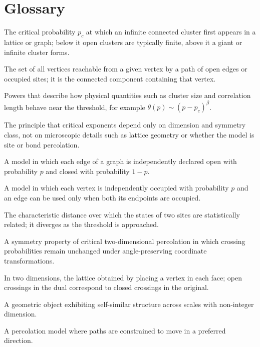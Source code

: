\section*{Glossary}
\begin{description}[leftmargin=*,style=nextline,itemsep=0.3em]
\item[\textbf{Percolation threshold.}] The critical probability $p_c$ at which an infinite connected cluster first appears in a lattice or graph; below it open clusters are typically finite, above it a giant or infinite cluster forms.
\item[\textbf{Open cluster.}] The set of all vertices reachable from a given vertex by a path of open edges or occupied sites; it is the connected component containing that vertex.
\item[\textbf{Critical exponents.}] Powers that describe how physical quantities such as cluster size and correlation length behave near the threshold, for example $\theta(p)\sim(p-p_c)^\beta$.
\item[\textbf{Universality.}] The principle that critical exponents depend only on dimension and symmetry class, not on microscopic details such as lattice geometry or whether the model is site or bond percolation.
\item[\textbf{Bond percolation.}] A model in which each edge of a graph is independently declared open with probability $p$ and closed with probability $1-p$.
\item[\textbf{Site percolation.}] A model in which each vertex is independently occupied with probability $p$ and an edge can be used only when both its endpoints are occupied.
\item[\textbf{Correlation length.}] The characteristic distance over which the states of two sites are statistically related; it diverges as the threshold is approached.
\item[\textbf{Conformal invariance.}] A symmetry property of critical two-dimensional percolation in which crossing probabilities remain unchanged under angle-preserving coordinate transformations.
\item[\textbf{Dual lattice.}] In two dimensions, the lattice obtained by placing a vertex in each face; open crossings in the dual correspond to closed crossings in the original.
\item[\textbf{Fractal.}] A geometric object exhibiting self-similar structure across scales with non-integer dimension.
\item[\textbf{Directed percolation.}] A percolation model where paths are constrained to move in a preferred direction.
\end{description}
